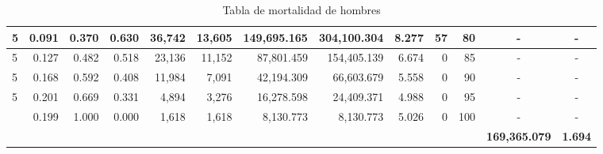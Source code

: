 \documentclass[fontsize=11pt]{article}
\begin{document}
\begin{landscape}
\begin{table}[]
\begin{tabular}{lrrrrrrrrrr|r|r|}
\multicolumn{1}{|l|}{5} & \multicolumn{1}{r|}{0.091} & \multicolumn{1}{r|}{0.370} & \multicolumn{1}{r|}{0.630} & \multicolumn{1}{r|}{36,742}  & \multicolumn{1}{r|}{13,605} & \multicolumn{1}{r|}{149,695.165} & \multicolumn{1}{r|}{304,100.304}   & \multicolumn{1}{r|}{8.277}  & \multicolumn{1}{r|}{57}    & 80                     & \multicolumn{1}{c|}{-}                    & \multicolumn{1}{c|}{-}              \\ \hline
\multicolumn{1}{|l|}{5} & \multicolumn{1}{r|}{0.127} & \multicolumn{1}{r|}{0.482} & \multicolumn{1}{r|}{0.518} & \multicolumn{1}{r|}{23,136}  & \multicolumn{1}{r|}{11,152} & \multicolumn{1}{r|}{87,801.459}  & \multicolumn{1}{r|}{154,405.139}   & \multicolumn{1}{r|}{6.674}  & \multicolumn{1}{r|}{0}     & 85                     & \multicolumn{1}{c|}{-}                    & \multicolumn{1}{c|}{-}              \\ \hline
\multicolumn{1}{|l|}{5} & \multicolumn{1}{r|}{0.168} & \multicolumn{1}{r|}{0.592} & \multicolumn{1}{r|}{0.408} & \multicolumn{1}{r|}{11,984}  & \multicolumn{1}{r|}{7,091}  & \multicolumn{1}{r|}{42,194.309}  & \multicolumn{1}{r|}{66,603.679}    & \multicolumn{1}{r|}{5.558}  & \multicolumn{1}{r|}{0}     & 90                     & \multicolumn{1}{c|}{-}                    & \multicolumn{1}{c|}{-}              \\ \hline
\multicolumn{1}{|l|}{5} & \multicolumn{1}{r|}{0.201} & \multicolumn{1}{r|}{0.669} & \multicolumn{1}{r|}{0.331} & \multicolumn{1}{r|}{4,894}   & \multicolumn{1}{r|}{3,276}  & \multicolumn{1}{r|}{16,278.598}  & \multicolumn{1}{r|}{24,409.371}    & \multicolumn{1}{r|}{4.988}  & \multicolumn{1}{r|}{0}     & 95                     & \multicolumn{1}{c|}{-}                    & \multicolumn{1}{c|}{-}              \\ \hline
\multicolumn{1}{|l|}{}  & \multicolumn{1}{r|}{0.199} & \multicolumn{1}{r|}{1.000} & \multicolumn{1}{r|}{0.000} & \multicolumn{1}{r|}{1,618}   & \multicolumn{1}{r|}{1,618}  & \multicolumn{1}{r|}{8,130.773}   & \multicolumn{1}{r|}{8,130.773}     & \multicolumn{1}{r|}{5.026}  & \multicolumn{1}{r|}{0}     & 100                    & \multicolumn{1}{c|}{-}                    & \multicolumn{1}{c|}{-}              \\ \hline
                        & \multicolumn{1}{l}{}       & \multicolumn{1}{l}{}       & \multicolumn{1}{l}{}       & \multicolumn{1}{l}{}         & \multicolumn{1}{l}{}        & \multicolumn{1}{l}{}             & \multicolumn{1}{l}{}               & \multicolumn{1}{l}{}        & \multicolumn{1}{l}{}       & \multicolumn{1}{l|}{}  & \multicolumn{1}{c|}{\textbf{169,365.079}} & \multicolumn{1}{c|}{\textbf{1.694}} \\ \cline{12-13} 
\end{tabular}
\caption{Tabla de mortalidad de hombres}
\label{my-label}
\end{table}
\end{landscape}
\end{document}
